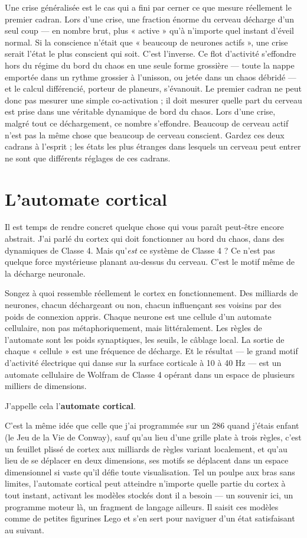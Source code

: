 \documentclass[11pt, twoside, openright]{book}
\begin{document}
Une crise généralisée est le cas qui a fini par cerner ce que mesure réellement le premier cadran. Lors d'une crise, une fraction énorme du cerveau décharge d'un seul coup --- en nombre brut, plus « active » qu'à n'importe quel instant d'éveil normal. Si la conscience n'était que « beaucoup de neurones actifs », une crise serait l'état le plus conscient qui soit. C'est l'inverse. Ce flot d'activité s'effondre hors du régime du bord du chaos en une seule forme grossière --- toute la nappe emportée dans un rythme grossier à l'unisson, ou jetée dans un chaos débridé --- et le calcul différencié, porteur de planeurs, s'évanouit. Le premier cadran ne peut donc pas mesurer une simple co-activation ; il doit mesurer quelle part du cerveau est prise dans une véritable dynamique de bord du chaos. Lors d'une crise, malgré tout ce déchargement, ce nombre s'effondre. Beaucoup de cerveau actif n'est pas la même chose que beaucoup de cerveau conscient. Gardez ces deux cadrans à l'esprit ; les états les plus étranges dans lesquels un cerveau peut entrer ne sont que différents réglages de ces cadrans.

\section*{L'automate cortical}

Il est temps de rendre concret quelque chose qui vous paraît peut-être encore abstrait. J'ai parlé du cortex qui doit fonctionner au bord du chaos, dans des dynamiques de Classe 4. Mais qu'\textit{est} ce système de Classe 4 ? Ce n'est pas quelque force mystérieuse planant au-dessus du cerveau. C'est le motif même de la décharge neuronale.

Songez à quoi ressemble réellement le cortex en fonctionnement. Des milliards de neurones, chacun déchargeant ou non, chacun influençant ses voisins par des poids de connexion appris. Chaque neurone est une cellule d'un automate cellulaire, non pas métaphoriquement, mais littéralement. Les règles de l'automate sont les poids synaptiques, les seuils, le câblage local. La sortie de chaque « cellule » est une fréquence de décharge. Et le résultat --- le grand motif d'activité électrique qui danse sur la surface corticale à 10 à 40 Hz --- est un automate cellulaire de Wolfram de Classe 4 opérant dans un espace de plusieurs milliers de dimensions.

J'appelle cela l'\textbf{automate cortical}.

C'est la même idée que celle que j'ai programmée sur un 286 quand j'étais enfant (le Jeu de la Vie de Conway), sauf qu'au lieu d'une grille plate à trois règles, c'est un feuillet plissé de cortex aux milliards de règles variant localement, et qu'au lieu de se déplacer en deux dimensions, ses motifs se déplacent dans un espace dimensionnel si vaste qu'il défie toute visualisation. Tel un poulpe aux bras sans limites, l'automate cortical peut atteindre n'importe quelle partie du cortex à tout instant, activant les modèles stockés dont il a besoin --- un souvenir ici, un programme moteur là, un fragment de langage ailleurs. Il saisit ces modèles comme de petites figurines Lego et s'en sert pour naviguer d'un état satisfaisant au suivant.
\end{document}
